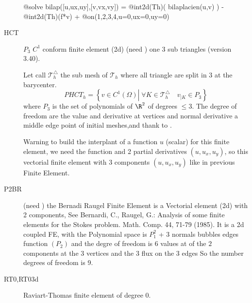 \documentclass[a4paper,twoside,12pt]{book}
\begin{document}
\begin{description}
         @solve bilap([u,ux,uy],[v,vx,vy]) =
             @int2d(Th)(  bilaplacien(u,v) )
           - @int2d(Th)(f*v)
           + @on(1,2,3,4,u=0,ux=0,uy=0)      
\eFF

      \item[HCT]  $P_3$ $C^1$ conform finite element (2d)  (need )  one 3 sub triangles (version 3.40). 
     
     Let call $\mathcal{T}^\triangle_{h}$ the sub mesh of $\mathcal{T}_{h}$ where all triangle are split in 3 at the
     barycenter.
     \begin{equation}
       PHCT_{h} = \left\{ v \in C^1(\Omega) \left|\; \forall K \in \mathcal{T}^\triangle_{h}
        \quad v_{|K} \in P_{3} \right.\right\} 
     \end{equation}
     where
     $P_{3}$ is the set of polynomials of $\R^{2}$ of  degrees $\le 3$. The degree of freedom are 
     the value and derivative at vertices and normal derivative a middle edge point of initial meshes,and thank to \cite{HCT}.
     
         Warning to build the interplant of a function $u$ (scalar) for this  finite element,
       we need the function and 2 partial derivatives $(u,u_x, u_y)$,
      so  this vectorial finite element with 3 components  $(u,u_x,u_y)$ like in previous Finite Element.
        

      \item[P2BR]  (need )  the Bernadi Raugel Finite Element is a Vectorial   element (2d)  with 2 components,
 See Bernardi, C., Raugel, G.: Analysis of some finite elements for the Stokes problem. Math. Comp. 44, 71-79 (1985).
 It is  a 2d coupled FE, with 
 the Polynomial space is $ P_1^2$ + 3 normals bubbles edges function $(P_2)$
and  the degre of freedom is 6 values at of the $2$ components at the  $3$ vertices
and the $3$ flux on the $3$ edges  
So the number  degrees of freedom is 9.      
      
      \item[RT0,RT03d]  Raviart-Thomas finite element of degree $0$.


\end{description}
\end{document}
